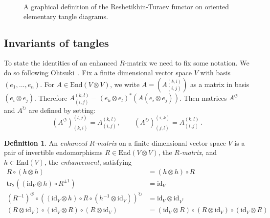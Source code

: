 \documentclass[12pt,reqno]{amsart}
\theoremstyle{definition}
\newtheorem{definition}[theorem]{Definition}
\def\tr{\mathrm{tr}}
\def\End{\mathrm{End}}
\newcommand{\coev}{\operatorname{coev}}
\def\rcoev{\widetilde\coev}
\begin{document}
\begin{figure}[htpb!]
\qquad
{}
\qquad 
{}
\caption{
  A graphical definition of the Reshetikhin-Turaev functor on oriented
  elementary tangle diagrams.}
\label{fig:FIG3}
\end{figure}

\subsection{Invariants of tangles}
\label{sub:tangles}

To state the identities of an enhanced $R$-matrix we need to fix some notation.
We do so following Ohtsuki~\cite{Ohtsuki}.
Fix a finite dimensional vector space $V$ with basis $(e_1, \ldots, e_n)$.
For $A \in \End(V \otimes V)$, we write $A = (A_{(i,j)}^{(k,l)})$ as a matrix in
basis $(e_i \otimes e_j)$. Therefore
$A_{(i,j)}^{(k,l)} = (e_k \otimes e_l)^{\ast}(A(e_i \otimes e_j))$. Then matrices $A^{\circlearrowleft}$ and $A^{\circlearrowright}$ are defined by setting: 
\[(A^\circlearrowleft)_{(k,i)}^{(l,j)} =A_{(i,j)}^{(k,l)}, \qquad
(A^\circlearrowright)_{(j,l)}^{(i,k)}=A_{(i,j)}^{(k,l)} \,.\]

\begin{definition}
\label{def.Rh}
An \emph{enhanced $R$-matrix} on a finite dimensional vector space $V$
is a pair of invertible endomorphisms $R \in \End(V\otimes V)$,
the \emph{$R$-matrix}, and $h \in \End(V)$, the \emph{enhancement}, satisfying
\begin{subequations}
\begin{align}
\label{eq1a}
R \circ (h \otimes h) &= (h \otimes h) \circ R \\
\label{eq1b}
\tr_{2} ((\mathrm{id}_V \otimes h) \circ R^{\pm 1}) &= \mathrm{id}_V \\
\label{eq1c}
(R^{-1})^{\circlearrowleft} \circ ((\mathrm{id}_V \otimes h)
\circ R \circ (h^{-1} \otimes \mathrm{id}_V))^{\circlearrowright} &=
\mathrm{id}_V \otimes \mathrm{id}_{V^{\ast}} \\
\label{eq1d}
(R \otimes \mathrm{id}_V) \circ (\mathrm{id}_V \otimes R)
\circ (R \otimes \mathrm{id}_V) &= (\mathrm{id}_V \otimes R)
\circ (R \otimes \mathrm{id}_V) \circ (\mathrm{id}_V \otimes R)
\end{align}
\end{subequations}
\end{definition}
\end{document}
